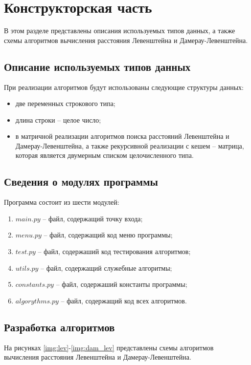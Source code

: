 \chapter{Конструкторская часть}
В этом разделе представлены описания используемых типов данных, а также схемы алгоритмов вычисления расстояния Левенштейна и Дамерау-Левенштейна.

\section{Описание используемых типов данных}
При реализации алгоритмов будут использованы следующие структуры данных:

\begin{itemize}[label=---]
    \item две переменных строкового типа;
    \item длина строки -- целое число;
    \item в матричной реализации алгоритмов поиска расстояний Левенштейна и Дамерау-Левенштейна, а также рекурсивной реализации с кешем -- матрица, которая является двумерным списком целочисленного типа.
\end{itemize}


\section{Сведения о модулях программы}
Программа состоит из шести модулей:
\begin{enumerate}[label=\arabic*)]
	\item $main.py$ -- файл, содержащий точку входа;
    \item $menu.py$ -- файл, содержащий код меню программы;
    \item $test.py$ -- файл, содержаший код тестирования алгоритмов;
    \item $utils.py$ -- файл, содержащий служебные алгоритмы;
    \item $constants.py$ -- файл, содержаший константы программы;
    \item $algorythms.py$ -- файл, содержащий код всех алгоритмов. \newline
\end{enumerate}


\section{Разработка алгоритмов}
На рисунках \ref{img:lev}-\ref{img:dam_lev} представлены схемы алгоритмов вычисления расстояния Левенштейна и Дамерау-Левенштейна.

